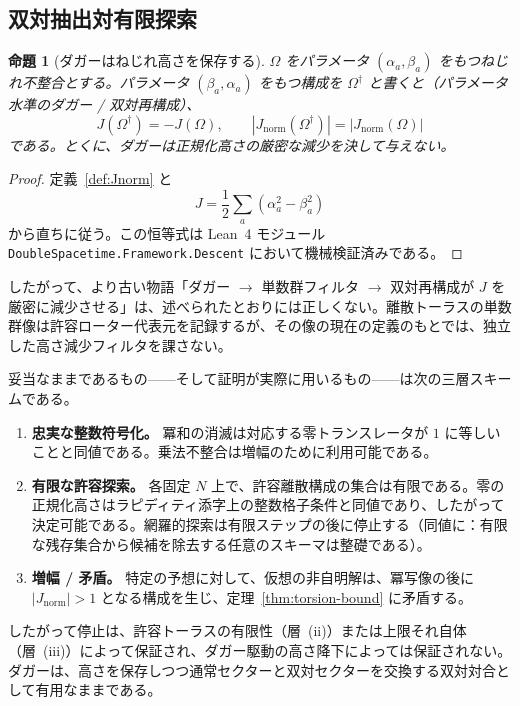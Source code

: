 \documentclass[a4paper]{article}
\newtheorem{proposition}[theorem]{命題}
\theoremstyle{definition}
\theoremstyle{remark}
\newcommand{\Jnorm}{J_{\mathrm{norm}}}
\begin{document}
\subsection{双対抽出対有限探索}
\label{sec:unified-descent}

\begin{proposition}[ダガーはねじれ高さを保存する]
\label{prop:dagger-height}
\(\Omega\) をパラメータ \((\alpha_a,\beta_a)\) をもつねじれ不整合とする。パラメータ \((\beta_a,\alpha_a)\) をもつ構成を \(\Omega^\dagger\) と書くと（パラメータ水準のダガー / 双対再構成）、
\[
J(\Omega^\dagger)=-J(\Omega),\qquad |\Jnorm(\Omega^\dagger)|=|\Jnorm(\Omega)|
\]
である。とくに、ダガーは正規化高さの厳密な減少を決して与えない。
\end{proposition}

\begin{proof}
定義~\ref{def:Jnorm} と
\[
J=\frac12\sum_a(\alpha_a^2-\beta_a^2)
\]
から直ちに従う。この恒等式は Lean~4 モジュール \texttt{DoubleSpacetime.\allowbreak Framework.\allowbreak Descent} において機械検証済みである。
\end{proof}

したがって、より古い物語「ダガー \(\to\) 単数群フィルタ \(\to\) 双対再構成が \(J\) を厳密に減少させる」は、述べられたとおりには正しくない。離散トーラスの単数群像は許容ローター代表元を記録するが、その像の現在の定義のもとでは、独立した高さ減少フィルタを課さない。

妥当なままであるもの——そして証明が実際に用いるもの——は次の三層スキームである。

\begin{enumerate}[label=(\roman*)]
  \item \textbf{忠実な整数符号化。} 冪和の消滅は対応する零トランスレータが \(1\) に等しいことと同値である。乗法不整合は増幅のために利用可能である。
  \item \textbf{有限な許容探索。} 各固定 \(N\) 上で、許容離散構成の集合は有限である。零の正規化高さはラピディティ添字上の整数格子条件と同値であり、したがって決定可能である。網羅的探索は有限ステップの後に停止する（同値に：有限な残存集合から候補を除去する任意のスキーマは整礎である）。
  \item \textbf{増幅 / 矛盾。} 特定の予想に対して、仮想の非自明解は、冪写像の後に \(|\Jnorm|>1\) となる構成を生じ、定理~\ref{thm:torsion-bound} に矛盾する。
\end{enumerate}

したがって停止は、許容トーラスの有限性（層~(ii)）または上限それ自体（層~(iii)）によって保証され、ダガー駆動の高さ降下によっては保証されない。ダガーは、高さを保存しつつ通常セクターと双対セクターを交換する双対対合として有用なままである。
\end{document}
